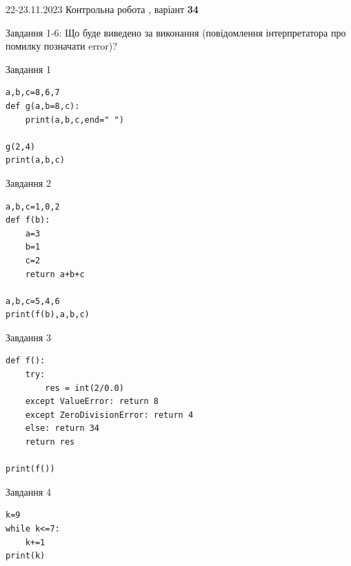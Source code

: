 \documentclass[12pt, ukrainian]{article}
\begin{document}
{{22-23.11.2023 Контрольна робота , варіант  \No \textbf { 34 }\par}}
{

Завдання 1-6: Що буде виведено за виконання (повідомлення інтерпретатора про помилку позначати error)?


\begin{minipage}[t]{9.7cm}                
{\begin{center}Завдання {1}\end{center}}
\begin{verbatim}
a,b,c=8,6,7
def g(a,b=8,c):
    print(a,b,c,end=" ")

g(2,4)
print(a,b,c)
\end{verbatim}     
\end{minipage}
\vline \hspace{8mm}
\begin{minipage}[t]{8.0cm}                
{\begin{center}Завдання {2}\end{center}}
\begin{verbatim}
a,b,c=1,0,2
def f(b):
    a=3
    b=1
    c=2
    return a+b+c

a,b,c=5,4,6
print(f(b),a,b,c)
\end{verbatim}     
\end{minipage}

\vspace{15mm}
\begin{minipage}[t]{9.7cm}                
{\begin{center}Завдання {3}\end{center}}
\begin{verbatim}
def f():
    try:
        res = int(2/0.0)
    except ValueError: return 8
    except ZeroDivisionError: return 4
    else: return 34
    return res

print(f())
\end{verbatim}     
\end{minipage}
\vline \hspace{8mm}
\begin{minipage}[t]{8.0cm}                
{\begin{center}Завдання {4}\end{center}}
\begin{verbatim}
k=9
while k<=7:
    k+=1
print(k)
\end{verbatim}     
\end{minipage}

}
\end{document}
